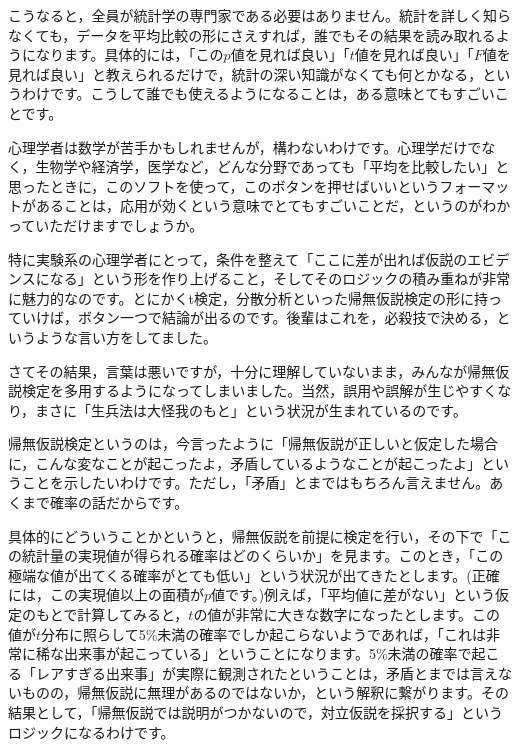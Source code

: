 \documentclass{ltjsbook}
\begin{document}
こうなると，全員が統計学の専門家である必要はありません。統計を詳しく知らなくても，データを平均比較の形にさえすれば，誰でもその結果を読み取れるようになります。具体的には，「この$p$値を見れば良い」「$t$値を見れば良い」「$F$値を見れば良い」と教えられるだけで，統計の深い知識がなくても何とかなる，というわけです。こうして誰でも使えるようになることは，ある意味とてもすごいことです。

心理学者は数学が苦手かもしれませんが，構わないわけです。心理学だけでなく，生物学や経済学，医学など，どんな分野であっても「平均を比較したい」と思ったときに，このソフトを使って，このボタンを押せばいいというフォーマットがあることは，応用が効くという意味でとてもすごいことだ，というのがわかっていただけますでしょうか。

特に実験系の心理学者にとって，条件を整えて「ここに差が出れば仮説のエビデンスになる」という形を作り上げること，そしてそのロジックの積み重ねが非常に魅力的なのです。とにかくt検定，分散分析といった帰無仮説検定の形に持っていけば，ボタン一つで結論が出るのです。後輩はこれを，必殺技で決める，というような言い方をしてました。

さてその結果，言葉は悪いですが，十分に理解していないまま，みんなが帰無仮説検定を多用するようになってしまいました。当然，誤用や誤解が生じやすくなり，まさに「生兵法は大怪我のもと」という状況が生まれているのです。

帰無仮説検定というのは，今言ったように「帰無仮説が正しいと仮定した場合に，こんな変なことが起こったよ，矛盾しているようなことが起こったよ」ということを示したいわけです。ただし，「矛盾」とまではもちろん言えません。あくまで確率の話だからです。

具体的にどういうことかというと，帰無仮説を前提に検定を行い，その下で「この統計量の実現値が得られる確率はどのくらいか」を見ます。このとき，「この極端な値が出てくる確率がとても低い」という状況が出てきたとします。(正確には，この実現値以上の面積が$p$値です。)例えば，「平均値に差がない」という仮定のもとで計算してみると，$t$の値が非常に大きな数字になったとします。この値が$t$分布に照らして5\%未満の確率でしか起こらないようであれば，「これは非常に稀な出来事が起こっている」ということになります。5\%未満の確率で起こる「レアすぎる出来事」が実際に観測されたということは，矛盾とまでは言えないものの，帰無仮説に無理があるのではないか，という解釈に繋がります。その結果として，「帰無仮説では説明がつかないので，対立仮説を採択する」というロジックになるわけです。
\end{document}
